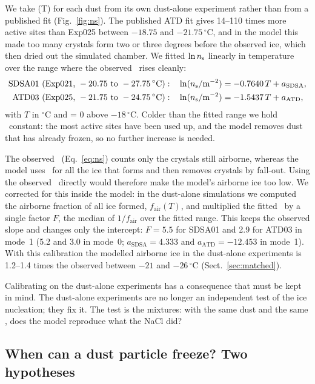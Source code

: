 We take \ns(T) for each dust from its own dust-alone experiment rather than from a published fit (Fig.~\ref{fig:ns}). The published ATD fit gives 14--110 times more active sites than Exp025 between $-18.75$ and $-21.75\,^\circ$C, and in the model this made too many crystals form two or three degrees before the observed ice, which then dried out the simulated chamber. We fitted $\ln n_\mathrm{s}$ linearly in temperature over the range where the observed \ns\ rises cleanly:
\begin{align}
  \text{SDSA01 (Exp021, } -20.75 \text{ to } -27.75\,^\circ\mathrm{C}):&\quad \ln(n_\mathrm{s}/\mathrm{m^{-2}}) = -0.7640\,T + a_\mathrm{SDSA}, \label{eq:ns_sdsa}\\
  \text{ATD03 (Exp025, } -21.75 \text{ to } -24.75\,^\circ\mathrm{C}):&\quad \ln(n_\mathrm{s}/\mathrm{m^{-2}}) = -1.5437\,T + a_\mathrm{ATD}, \label{eq:ns_atd}
\end{align}
with $T$ in $^\circ$C and \ns = 0 above $-18\,^\circ$C. Colder than the fitted range we hold \ns\ constant: the most active sites have been used up, and the model removes dust that has already frozen, so no further increase is needed.

The observed \ns\ (Eq.~\ref{eq:ns}) counts only the crystals still airborne, whereas the model uses \ns\ for all the ice that forms and then removes crystals by fall-out. Using the observed \ns\ directly would therefore make the model's airborne ice too low. We corrected for this inside the model: in the dust-alone simulations we computed the airborne fraction of all ice formed, $f_\mathrm{air}(T)$, and multiplied the fitted \ns\ by a single factor $F$, the median of $1/f_\mathrm{air}$ over the fitted range. This keeps the observed slope and changes only the intercept: $F = 5.5$ for SDSA01 and 2.9 for ATD03 in mode~1 (5.2 and 3.0 in mode~0; $a_\mathrm{SDSA} = 4.333$ and $a_\mathrm{ATD} = -12.453$ in mode~1). With this calibration the modelled airborne ice in the dust-alone experiments is 1.2--1.4 times the observed between $-21$ and $-26\,^\circ$C (Sect.~\ref{sec:matched}).

Calibrating on the dust-alone experiments has a consequence that must be kept in mind. The dust-alone experiments are no longer an independent test of the ice nucleation; they fix it. The test is the mixtures: with the same dust and the same \ns, does the model reproduce what the NaCl did?

\subsection{When can a dust particle freeze? Two hypotheses}\label{sec:hypotheses}

